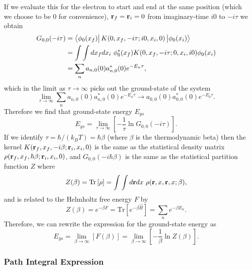 If we evaluate this for the electron to start and end at the same position (which we choose to be $0$ for convenience), $\vb{r}_f = \vb{r}_i = 0$ from imaginary-time $i0$ to $-i\tau$ we obtain
\begin{equation}
    \begin{aligned}
    G_{0,0}(-i\tau) &= \bra{\phi_0(x_f)} K(0, x_f, -i\tau; i0, x_i, 0) \ket{\phi_0(x_i)} \\
    &= \int\int dx_f dx_i\ \phi_0^*(x_f) K(0, x_f, -i\tau; 0, x_i, i0) \phi_0(x_i) \\
    &= \sum_n a_{n,0}(0) a^*_{n,0}(0) e^{-E_n \tau},
    \end{aligned}
\label{eqn-221-5}
\end{equation}
which in the limit as $\tau \to \infty$ picks out the ground-state of the system
\begin{equation}
    \lim_{\tau \to \infty} \sum_n a_{n,0}(0) a^*_{n,0}(0) e^{-E_n \tau} \rightarrow a_{0,0}(0) a^*_{0,0}(0) e^{-E_0 \tau}.
\label{eqn-221-6}
\end{equation}
Therefore we find that ground-state energy $E_{gs}$
\begin{equation}
    E_{gs} = \lim_{\tau \to \infty} \left[-\frac{1}{\tau} \ln G_{0,0}(-i\tau) \right].
\label{eqn-221-7}
\end{equation}
If we identify $\tau = \hbar /(k_B T) = \hbar\beta$ (where $\beta$ is the thermodynamic beta) then the kernel $K(\vb{r}_{f}, x_f, -i\beta; \vb{r}_{i}, x_i, 0)$ is the same as the statistical density matrix $\rho(\vb{r}_{f}, x_f, \hbar\beta; \vb{r}_{i}, x_i, 0)$, and $G_{0,0}(-i\hbar\beta)$ is the same as the statistical partition function $Z$ where
\begin{equation}
    Z(\beta) = \textrm{Tr} \left[\rho\right] = \int \int d\vb{r} dx\ \rho(\vb{r}, x, \vb{r}, x; \beta),
\label{eqn-221-8}
\end{equation}
and is related to the Helmholtz free energy $F$ by
\begin{equation}
    Z(\beta) = e^{-\beta F} = \textrm{Tr}\left[ e^{-\beta \hat{H}}\right] = \sum_n e^{-\beta E_n}.
\label{eqn-221-9}
\end{equation}
Therefore, we can rewrite the expression for the ground-state energy as
\begin{equation}
    E_{gs} = \lim_{\beta \to \infty}\left[F(\beta) \right] = \lim_{\beta \to \infty} \left[-\frac{1}{\beta} \ln Z(\beta) \right].
\label{eqn-221-10}
\end{equation}

\subsubsection{Path Integral Expression}
\label{subsubsec:2-2-1-1}

